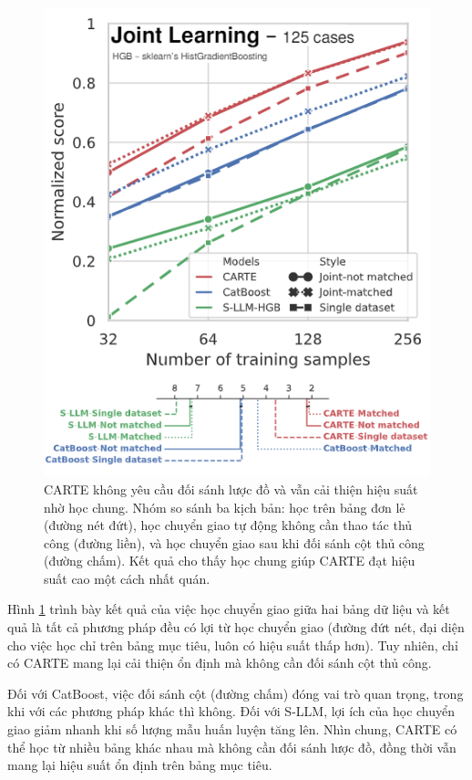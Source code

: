 \documentclass{article}
\begin{document}
\begin{figure} 
    \centering
    \includegraphics[scale = 0.7]{carte_schema_matching_not_required.png}
    \caption{CARTE không yêu cầu đối sánh lược đồ và vẫn cải thiện hiệu suất nhờ học chung. Nhóm so sánh ba kịch bản: học trên bảng đơn lẻ (đường nét đứt), học chuyển giao tự động không cần thao tác thủ công (đường liền), và học chuyển giao sau khi đối sánh cột thủ công (đường chấm). Kết quả cho thấy học chung giúp CARTE đạt hiệu suất cao một cách nhất quán.}
    \label{fig:carte_schema_matching_not_required}
\end{figure}

Hình \ref{fig:carte_schema_matching_not_required} trình bày kết quả của việc học chuyển giao giữa hai bảng dữ liệu và kết quả là tất cả phương pháp đều có lợi từ học chuyển giao (đường đứt nét, đại diện cho việc học chỉ trên bảng mục tiêu, luôn có hiệu suất thấp hơn). Tuy nhiên, chỉ có CARTE mang lại cải thiện ổn định mà không cần đối sánh cột thủ công.

Đối với CatBoost, việc đối sánh cột (đường chấm) đóng vai trò quan trọng, trong khi với các phương pháp khác thì không. Đối với S-LLM, lợi ích của học chuyển giao giảm nhanh khi số lượng mẫu huấn luyện tăng lên. Nhìn chung, CARTE có thể học từ nhiều bảng khác nhau mà không cần đối sánh lược đồ, đồng thời vẫn mang lại hiệu suất ổn định trên bảng mục tiêu.
\end{document}
